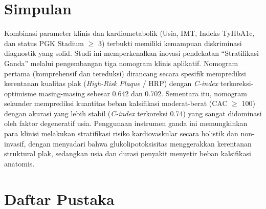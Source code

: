 \documentclass[
  indonesian,
]{agujournal2019}
\begin{document}
\section{Simpulan}\label{simpulan}

Kombinasi parameter klinis dan kardiometabolik (Usia, IMT, Indeks
TyHbA1c, dan status PGK Stadium \(\ge\) 3) terbukti memiliki kemampuan
diskriminasi diagnostik yang solid. Studi ini memperkenalkan inovasi
pendekatan ``Stratifikasi Ganda'' melalui pengembangan tiga nomogram
klinis aplikatif. Nomogram pertama (komprehensif dan tereduksi)
dirancang secara spesifik memprediksi kerentanan kualitas plak
(\emph{High-Risk Plaque} / HRP) dengan \emph{C-index}
terkoreksi-optimisme masing-masing sebesar 0.642 dan 0.702. Sementara
itu, nomogram sekunder memprediksi kuantitas beban kalsifikasi
moderat-berat (CAC \(\ge\) 100) dengan akurasi yang lebih stabil
(\emph{C-index} terkoreksi 0.74) yang sangat didominasi oleh faktor
degeneratif usia. Penggunaan instrumen ganda ini memungkinkan para
klinisi melakukan stratifikasi risiko kardiovaskular secara holistik dan
non-invasif, dengan menyadari bahwa glukolipotoksisitas menggerakkan
kerentanan struktural plak, sedangkan usia dan durasi penyakit menyetir
beban kalsifikasi anatomis.

\section{Daftar Pustaka}\label{daftar-pustaka}
\end{document}
